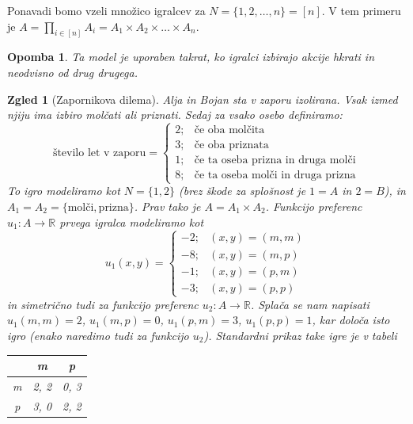 \documentclass[10pt, a4paper]{article}
\newtheorem*{opomba}{Opomba}
\newtheorem{zgled}[izr]{Zgled}
\newcommand{\R}{\mathbb {R}}
\begin{document}
Ponavadi bomo vzeli množico igralcev za $N = \{1, 2, \dots, n\} = [n]$.
V tem primeru je $A = \prod_{i \in [n]} A_i = A_1 \times A_2 \times \dots \times A_n$.

\begin{opomba}
    Ta model je uporaben takrat, ko igralci izbirajo akcije hkrati in neodvisno od drug drugega.
\end{opomba}

\begin{zgled}[Zapornikova dilema]
    Alja in Bojan sta v zaporu izolirana.
    Vsak izmed njiju ima izbiro molčati ali priznati.
    Sedaj za vsako osebo definiramo:
    $$\textrm{število let v zaporu} = \begin{cases}
        2; & \textrm{če oba molčita}\\
        3; & \textrm{če oba priznata}\\
        1; & \textrm{če ta oseba prizna in druga molči}\\ 
        8; & \textrm{če ta oseba molči in druga prizna}
    \end{cases}$$
    To igro modeliramo kot $N = \{1, 2\}$ (brez škode za splošnost je $1 = A$ in $2 = B$),
    in $A_1 = A_2 = \{\textrm{molči}, \textrm{prizna}\}$.
    Prav tako je $A = A_1 \times A_2$. Funkcijo preferenc $u_1 : A \to \R$ prvega igralca modeliramo 
    kot 
    $$u_1 (x, y) = \begin{cases}
        -2; & (x, y) = (m, m)\\
        -8; & (x, y) = (m, p)\\
        -1; & (x, y) = (p, m)\\
        -3; &(x, y) = (p, p)
    \end{cases}$$
    in simetrično tudi za funkcijo preferenc $u_2 : A \to \R$.
    Splača se nam napisati $u_1(m, m) = 2$, $u_1 (m, p) = 0$, $u_1 (p, m) = 3$, $u_1 (p, p) = 1$,
    kar določa isto igro (enako naredimo tudi za funkcijo $u_2$).
    Standardni prikaz take igre je v tabeli
    \begin{center}
        {\begin{tabular}{c|c|c|}
            & m & p\\
            \hline
            m & 2, 2 & 0, 3\\
            \hline
            p & 3, 0 & 2, 2\\
            \hline
        \end{tabular}}        
    \end{center}
\end{zgled}
\end{document}

